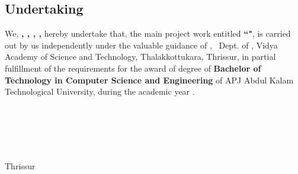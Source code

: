 %
%
%
%


\begin{titlepage}



\chapter*{\centering Undertaking}
%


\quad \quad We, {\bf \vauthora , \vauthorb , \vauthorc , \vauthord ,   \vauthore } hereby undertake that, the main project work entitled {\bf ``\vtitle"}, is carried out by us independently under the valuable guidance of {\bf \vguide}, \vguidedg\ Dept. of \vdept, Vidya Academy of Science and Technology, Thalakkottukara, Thrissur, in partial fulfillment of the requirements for the award of degree of {\bf Bachelor of Technology in Computer Science and  Engineering } of APJ Abdul Kalam Technological University, during the academic year \vacademicyear.\\[1 cm]

\begin{flushright}
{\bf \vauthora\\
\vauthorb\\
\vauthorc\\
\vauthord\\
\vauthore}
\end{flushright}
\noindent Thrissur \\
\vdate 


\end{titlepage}



